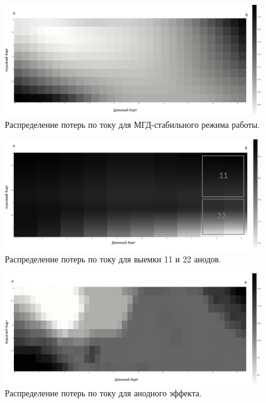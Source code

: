 \documentclass[]{pmi}
\begin{document}
\begin{figure}[H]
    \centering
    \includegraphics[width=150mm]{h.png}
    \caption{Распределение потерь по току для МГД-стабильного режима работы.}
    \label{fig:stabrasp}
\end{figure}

\begin{figure}[H]
    \centering
    \includegraphics[width=150mm]{выемка анодов.png}
    \caption{Распределение потерь по току для выемки 11 и 22 анодов.}
    \label{fig:viemkaanodrasp} 
\end{figure}

\begin{figure}[H]
    \centering
    \includegraphics[width=150mm]{анодный эффект.png}
    \caption{Распределение потерь по току для анодного эффекта.}
    \label{fig:anodeffectrasp} 
\end{figure}
\end{document}
